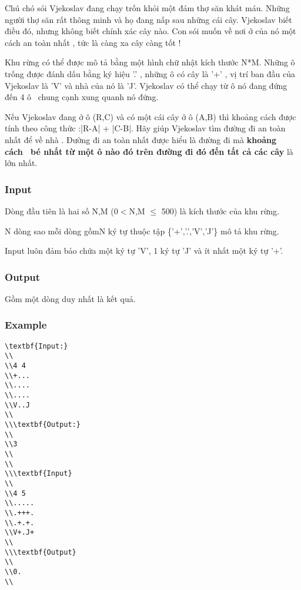 



   Chú chó sói Vjekoslav đang chạy trốn khỏi một đám thợ săn khát máu. Những người thợ săn rất thông minh và họ đang nấp sau những cái cây. Vjekoslav biết điều đó, nhưng không biết chính xác cây nào. Con sói muốn về nơi ở của nó một cách an toàn nhất , tức là càng xa cây càng tốt !  

   Khu rừng có thể được mô tả bằng một hình chữ nhật kích thước N*M. Những ô trống được đánh dấu bằng ký hiệu '.' , những ô có cây là '+' , vị trí ban đầu của Vjekoslav là 'V' và nhà của nó là 'J'. Vjekoslav có thể chạy từ ô nó đang đứng đến 4 ô  chung cạnh xung quanh nó đứng.  

   Nếu Vjekoslav đang ở ô (R,C) và có một cái cây ở ô (A,B) thì khoảng cách được tính theo công thức :|R-A| + |C-B|. Hãy giúp Vjekoslav tìm đường đi an toàn nhất để về nhà . Đường đi an toàn nhất được hiểu là đường đi mà   \textbf{    khoảng cách  bé nhất từ một ô nào đó trên đường đi đó đến tất cả các cây   }   là lớn nhất.  

\subsubsection{   Input  }

   Dòng đầu tiên là hai số N,M (0$<$N,M  $\le$ 500) là kích thước của khu rừng.  

   N dòng sao mỗi dòng gồmN ký tự thuộc tập \{'+','.','V','J'\} mô tả khu rừng.  

   Input luôn đảm bảo chứa một ký tự 'V', 1 ký tự 'J' và ít nhất một ký tự '+'.  

\subsubsection{   Output  }

   Gồm một dòng duy nhất là kết quả.  

\subsubsection{   Example  }
\begin{verbatim}
\textbf{Input:}
\\
\\4 4
\\+...
\\....
\\....
\\V..J
\\
\\\textbf{Output:}
\\
\\3
\\
\\
\\\textbf{Input}
\\
\\4 5
\\.....
\\.+++.
\\.+.+.
\\V+.J+
\\
\\\textbf{Output}
\\
\\0.
\\\end{verbatim}
